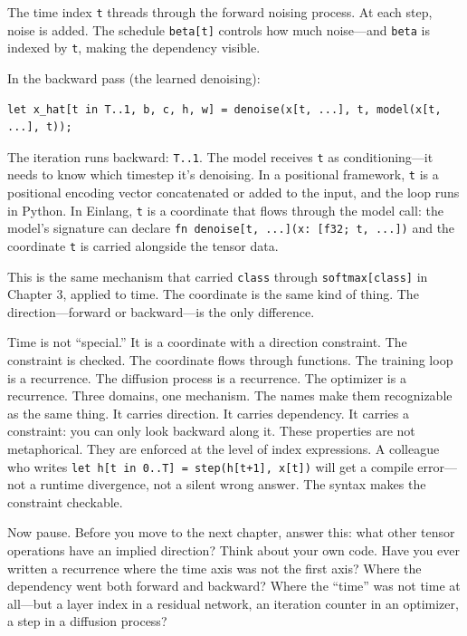 \documentclass[11pt,titlepage]{article}
\begin{document}
The time index \texttt{t} threads through the forward noising process.
At each step, noise is added. The schedule \texttt{beta{[}t{]}} controls
how much noise---and \texttt{beta} is indexed by \texttt{t}, making the
dependency visible.

In the backward pass (the learned denoising):

\begin{verbatim}
let x_hat[t in T..1, b, c, h, w] = denoise(x[t, ...], t, model(x[t, ...], t));
\end{verbatim}

The iteration runs backward: \texttt{T..1}. The model receives
\texttt{t} as conditioning---it needs to know which timestep it's
denoising. In a positional framework, \texttt{t} is a positional
encoding vector concatenated or added to the input, and the loop runs in
Python. In Einlang, \texttt{t} is a coordinate that flows through the
model call: the model's signature can declare
\texttt{fn\ denoise{[}t,\ ...{]}(x:\ {[}f32;\ t,\ ...{]})} and the
coordinate \texttt{t} is carried alongside the tensor data.

This is the same mechanism that carried \texttt{class} through
\texttt{softmax{[}class{]}} in Chapter 3, applied to time. The
coordinate is the same kind of thing. The direction---forward or
backward---is the only difference.

Time is not ``special.'' It is a coordinate with a direction constraint.
The constraint is checked. The coordinate flows through functions. The
training loop is a recurrence. The diffusion process is a recurrence.
The optimizer is a recurrence. Three domains, one mechanism. The names
make them recognizable as the same thing. It carries direction. It
carries dependency. It carries a constraint: you can only look backward
along it. These properties are not metaphorical. They are enforced at
the level of index expressions. A colleague who writes
\texttt{let\ h{[}t\ in\ 0..T{]}\ =\ step(h{[}t+1{]},\ x{[}t{]})} will
get a compile error---not a runtime divergence, not a silent wrong
answer. The syntax makes the constraint checkable.

Now pause. Before you move to the next chapter, answer this: what other
tensor operations have an implied direction? Think about your own code.
Have you ever written a recurrence where the time axis was not the first
axis? Where the dependency went both forward and backward? Where the
``time'' was not time at all---but a layer index in a residual network,
an iteration counter in an optimizer, a step in a diffusion process?
\end{document}

